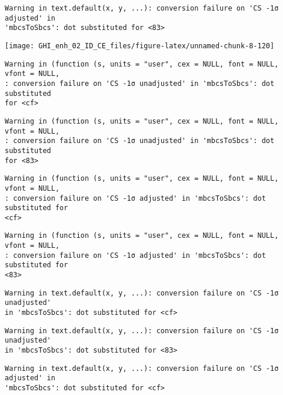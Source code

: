 \documentclass[
  10pt,
  a4paper,oneside]{article}
\begin{document}
\begin{verbatim}
Warning in text.default(x, y, ...): conversion failure on 'CS -1σ adjusted' in
'mbcsToSbcs': dot substituted for <83>
\end{verbatim}

\begin{center}\texttt{[image: GHI\_enh\_02\_ID\_CE\_files/figure-latex/unnamed-chunk-8-120]} \end{center}

\begin{verbatim}
Warning in (function (s, units = "user", cex = NULL, font = NULL, vfont = NULL,
: conversion failure on 'CS -1σ unadjusted' in 'mbcsToSbcs': dot substituted
for <cf>
\end{verbatim}

\begin{verbatim}
Warning in (function (s, units = "user", cex = NULL, font = NULL, vfont = NULL,
: conversion failure on 'CS -1σ unadjusted' in 'mbcsToSbcs': dot substituted
for <83>
\end{verbatim}

\begin{verbatim}
Warning in (function (s, units = "user", cex = NULL, font = NULL, vfont = NULL,
: conversion failure on 'CS -1σ adjusted' in 'mbcsToSbcs': dot substituted for
<cf>
\end{verbatim}

\begin{verbatim}
Warning in (function (s, units = "user", cex = NULL, font = NULL, vfont = NULL,
: conversion failure on 'CS -1σ adjusted' in 'mbcsToSbcs': dot substituted for
<83>
\end{verbatim}

\begin{verbatim}
Warning in text.default(x, y, ...): conversion failure on 'CS -1σ unadjusted'
in 'mbcsToSbcs': dot substituted for <cf>
\end{verbatim}

\begin{verbatim}
Warning in text.default(x, y, ...): conversion failure on 'CS -1σ unadjusted'
in 'mbcsToSbcs': dot substituted for <83>
\end{verbatim}

\begin{verbatim}
Warning in text.default(x, y, ...): conversion failure on 'CS -1σ adjusted' in
'mbcsToSbcs': dot substituted for <cf>
\end{verbatim}
\end{document}
